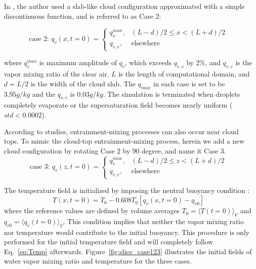 \documentclass[draft,jgrga]{AGUTeX}
\newcommand{\Eq}[1]{Eq.~\eqref{#1}} \newcommand{\Fig}[1]{Figure~\ref{#1}}
\begin{document}
\begin{article}
In \cite{Kumar11}, the author used a slab-like cloud configuration approximated with a simple discontinuous function, and is referred to as Case 2:

\begin{equation}
\mbox{case 2: } q_v(x,t=0) = 
\left\{\begin{array}{lr}
q_v^{max}, & (L-d)/2 \le x < (L+d)/2\\
q_{v,e}, & \mbox{elsewhere}
\end{array}\right.\label{case2}
\end{equation}

where $q_v^{max}$ is maximum amplitude of $q_v$, which exceeds $q_{v,s}$ by $2\%$, and $q_{v,e}$ is the vapor mixing ratio of the clear air. $L$ is the length of computational domain, and $d = L/2$ is the width of the cloud slab. The $q_{max}$ in each case is set to be $3.95g/kg$ and the $q_{v,e}$ is $0.03g/kg$. The simulation is terminated when droplets completely evaporate or the supersaturation field becomes nearly uniform ($std<0.0002$).

According to studies, entrainment-mixing processes can also occur near cloud tops. To mimic the cloud-top entrainment-mixing process, herein we add a new cloud configuration by rotating Case 2 by $90$ degree, and name it Case 3.
\begin{equation}
\mbox{case 3: } q_v(z,t=0) = 
\left\{\begin{array}{lr}
q_v^{max}, & (L-d)/2 \le z < (L+d)/2\\
q_{v,e}, & \mbox{elsewhere}
\end{array}\right.\label{case3}
\end{equation}

The temperature field is initialized by imposing the neutral buoyancy condition \cite{Kumar14}:
\begin{equation}
T(x,t = 0) = T_0 - 0.608T_0[q_v(x,t = 0) - q_{v0}]
\end{equation}
where the reference values are defined by volume averages $T_0 = \langle T(t=0)\rangle_V$ and $q_{v0} = \langle q_v(t=0)\rangle_V$. This condition implies that neither the vapor mixing ratio nor temperature would contribute to the initial buoyancy. This procedure is only performed for the initial temperature field and will completely follow \Eq{eq:Temp} afterwards. \Fig{fig:slice_case123} illustrates the initial fields of water vapor mixing ratio and temperature for the three cases.


\end{article}
\end{document}
